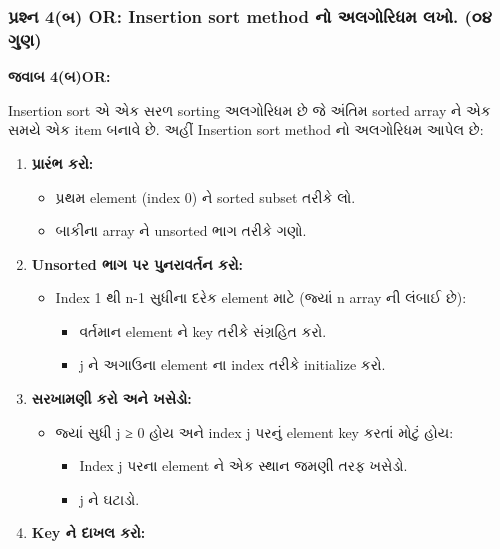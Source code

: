 \hypertarget{uxaaauxab0uxab6uxaa8-4uxaac-or-insertion-sort-method-uxaa8-uxa85uxab2uxa97uxab0uxaa7uxaae-uxab2uxa96.-uxae6uxaea-uxa97uxaa3}{%
\subsubsection{પ્રશ્ન 4(બ) OR: Insertion sort method નો અલગોરિધમ લખો. (૦૪
ગુણ)}\label{uxaaauxab0uxab6uxaa8-4uxaac-or-insertion-sort-method-uxaa8-uxa85uxab2uxa97uxab0uxaa7uxaae-uxab2uxa96.-uxae6uxaea-uxa97uxaa3}}

\textbf{જવાબ 4(બ)OR:}

Insertion sort એ એક સરળ sorting અલગોરિધમ છે જે અંતિમ sorted array ને એક સમયે
એક item બનાવે છે. અહીં Insertion sort method નો અલગોરિધમ આપેલ છે:

\begin{enumerate}
\def\labelenumi{\arabic{enumi}.}
\tightlist
\item
  \textbf{પ્રારંભ કરો:}

  \begin{itemize}
  \tightlist
  \item
    પ્રથમ element (index 0) ને sorted subset તરીકે લો.
  \item
    બાકીના array ને unsorted ભાગ તરીકે ગણો.
  \end{itemize}
\item
  \textbf{Unsorted ભાગ પર પુનરાવર્તન કરો:}

  \begin{itemize}
  \tightlist
  \item
    Index 1 થી n-1 સુધીના દરેક element માટે (જ્યાં n array ની લંબાઈ છે):

    \begin{itemize}
    \tightlist
    \item
      વર્તમાન element ને key તરીકે સંગ્રહિત કરો.
    \item
      j ને અગાઉના element ના index તરીકે initialize કરો.
    \end{itemize}
  \end{itemize}
\item
  \textbf{સરખામણી કરો અને ખસેડો:}

  \begin{itemize}
  \tightlist
  \item
    જ્યાં સુધી j ≥ 0 હોય અને index j પરનું element key કરતાં મોટું હોય:

    \begin{itemize}
    \tightlist
    \item
      Index j પરના element ને એક સ્થાન જમણી તરફ ખસેડો.
    \item
      j ને ઘટાડો.
    \end{itemize}
  \end{itemize}
\item
  \textbf{Key ને દાખલ કરો:}


\end{enumerate}
